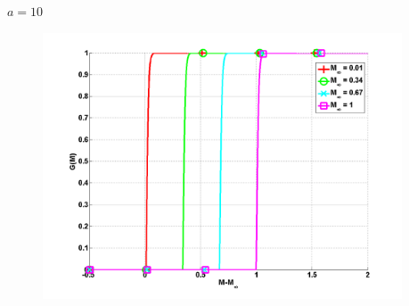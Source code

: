 \documentclass[xcolor=dvipsnames,10pt]{beamer}
\begin{document}
\begin{frame}
\begin{block}{$a=10$}
\begin{figure}[H]
\centering
\includegraphics[width=0.95\textwidth]{function_Mach_nb.png}
\end{figure}
\end{block}
\end{frame}
\end{document}
